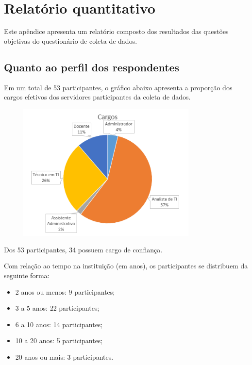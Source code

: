 \chapter{Relatório quantitativo} %
\label{apendice:c_relat_quantitativo}

Este apêndice apresenta um relatório composto dos resultados das questões objetivas do questionário de coleta de dados.
\section{Quanto ao perfil dos respondentes}
Em um total de 53 participantes, o gráfico abaixo apresenta a proporção dos cargos efetivos dos servidores participantes da coleta de dados.

\begin{figure}[h]
\centering %
\includegraphics[width=9cm]{figuras/apendiceC_cargos.png}
\end{figure}

Dos 53 participantes, 34 possuem cargo de confiança.

Com relação ao tempo na instituição (em anos), os participantes se distribuem da seguinte forma:
\begin{itemize}
\item 2 anos ou menos: 9 participantes;
\item 3 a 5 anos: 22 participantes;
\item 6 a 10 anos: 14 participantes;
\item 10 a 20 anos: 5 participantes;
\item 20 anos ou mais: 3 participantes.
\end{itemize}

